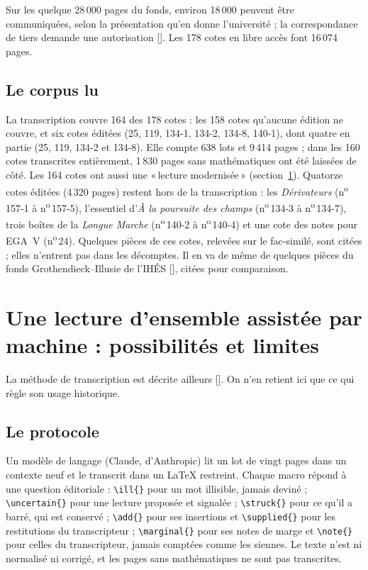 \documentclass[11pt]{amsart}
\newcommand{\mot}[1]{«\,#1\,»}
\newcommand{\cote}[1]{\mbox{n\textsuperscript{o}\,#1}}
\newcommand{\autocite}[1]{\citealp{hua2026#1}}
\begin{document}
Sur les quelque 28\,000 pages du fonds, environ 18\,000 peuvent être communiquées, selon la présentation qu'en donne l'université ; la correspondance de tiers demande une autorisation [\citealp{montpellier}]. Les 178 cotes en libre accès font 16\,074 pages.

\subsection{Le corpus lu}

La transcription couvre 164 des 178 cotes : les 158 cotes qu'aucune édition ne couvre, et six cotes éditées (25, 119, 134-1, 134-2, 134-8, 140-1), dont quatre en partie (25, 119, 134-2 et 134-8). Elle compte 638 lots et 9\,414 pages ; dans les 160 cotes transcrites entièrement, 1\,830 pages sans mathématiques ont été laissées de côté. Les 164 cotes ont aussi une \mot{lecture modernisée} (section~\ref{sec:methode}). Quatorze cotes éditées (4\,320 pages) restent hors de la transcription : les \emph{Dérivateurs} (\cote{157-1} à \cote{157-5}), l'essentiel d'\emph{À la poursuite des champs} (\cote{134-3} à \cote{134-7}), trois boîtes de la \emph{Longue Marche} (\cote{140-2} à \cote{140-4}) et une cote des notes pour EGA~V (\cote{24}). Quelques pièces de ces cotes, relevées sur le fac-similé, sont citées ; elles n'entrent pas dans les décomptes. Il en va de même de quelques pièces du fonds Grothendieck--Illusie de l'IHÉS [\citealp{ihesillusie}], citées pour comparaison.

\section{Une lecture d'ensemble assistée par machine : possibilités et limites}\label{sec:methode}

La méthode de transcription est décrite ailleurs [\autocite{a}]. On n'en retient ici que ce qui règle son usage historique.

\subsection{Le protocole}

Un modèle de langage (Claude, d'Anthropic) lit un lot de vingt pages dans un contexte neuf et le transcrit dans un \LaTeX{} restreint. Chaque macro répond à une question éditoriale : \verb|\ill{}| pour un mot illisible, jamais deviné ; \verb|\uncertain{}| pour une lecture proposée et signalée ; \verb|\struck{}| pour ce qu'il a barré, qui est conservé ; \verb|\add{}| pour ses insertions et \verb|\supplied{}| pour les restitutions du transcripteur ; \verb|\marginal{}| pour ses notes de marge et \verb|\note{}| pour celles du transcripteur, jamais comptées comme les siennes. Le texte n'est ni normalisé ni corrigé, et les pages sans mathématiques ne sont pas transcrites.
\end{document}

